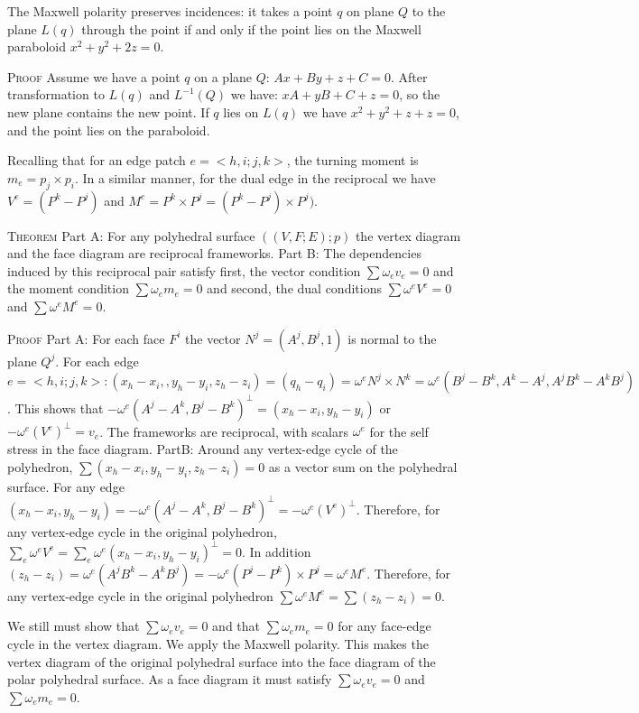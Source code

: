 \documentclass[11pt]{article}
\begin{document}
 The Maxwell polarity preserves incidences: it takes a point $q$ on plane $Q$ to the plane $L(q)$ through the point if and only if the point lies on the Maxwell paraboloid $x^2 + y^2 + 2z = 0$.
 
 \textsc{Proof} Assume we have a point $q$ on a plane $Q$: $Ax + By + z + C = 0$. After transformation to $L(q)$ and $L^{-1}(Q)$ we have: $xA + yB + C + z = 0$, so the new plane contains the new point. If $q$ lies on $L(q)$ we have $x^2 + y^2 + z + z = 0$, and the point lies on the paraboloid. 
 
 Recalling that for an edge patch $e = <h,i;j,k>$, the turning moment is $m_e = p_j \times p_i$. In a similar manner, for the dual edge in the reciprocal we have $V^e = (P^k - P^j)$ and $M^e = P^k \times P^j = (P^k - P^j)\times P^j)$.
 
 \textsc{Theorem} Part A: For any polyhedral surface $((V,F;E);p)$ the vertex diagram and the face diagram are reciprocal frameworks.
 Part B: The dependencies induced by this reciprocal pair satisfy first, the vector condition $\sum \omega_e v_e = 0$ and the moment condition $\sum \omega_e m_e = 0$ and second, the dual conditions $\sum \omega^e V^e = 0$ and $\sum \omega^e M^e = 0$.
 
 \textsc{Proof} Part A: For each face $F^i$ the vector $N^j = (A^j, B^j,1)$ is normal to the plane $Q^j$. For each edge $e = <h,i;j,k>:  (x_h-x_i,,y_h-y_i, z_h-z_i)=(q_h-q_i) = \omega^e N^j \times N^k = \omega^e(B^j-B^k,A^k-A^j,A^jB^k-A^kB^j)$. This shows that $-\omega^e(A^j-A^k,B^j-B^k)^\bot = (x_h - x_i, y_h-y_i)$ or $-\omega^e(V^e)^\bot = v_e$. The frameworks are reciprocal, with scalars $\omega^e$ for the self stress in the face diagram.
 PartB: Around any vertex-edge cycle of the polyhedron, $\sum(x_h - x_i, y_h-y_i, z_h-z_i) = 0$ as a vector sum on the polyhedral surface. For any edge $(x_h-x_i,y_h-y_i) = -\omega^e(A^j-A^k,B^j-B^k)^\bot = -\omega^e(V^e)^\bot$. Therefore, for any vertex-edge cycle in the original polyhedron, $\sum_e \omega^eV^e = \sum_e \omega^e(x_h-x_i,y_h-y_i)^\bot = 0$. In addition $(z_h-z_i) = \omega^e(A^jB^k-A^kB^j) = -\omega^e(P^j-P^k) \times P^j = \omega^eM^e$. Therefore, for any vertex-edge cycle in the original polyhedron $\sum \omega^eM^e = \sum(z_h-z_i) = 0$. 
 
 We still must show that $\sum \omega_e v_e = 0$ and that $\sum \omega_em_e = 0$ for any face-edge cycle in the vertex diagram. We apply the Maxwell polarity. This makes the vertex diagram of the original polyhedral surface into the face diagram of the polar polyhedral surface. As a face diagram it must satisfy $\sum \omega_e v_e = 0$ and $\sum \omega_em_e = 0$.
 
\end{document}
